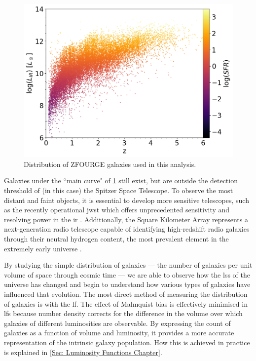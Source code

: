 \begin{figure}[h]
    \centering
    \includegraphics[width=\textwidth]{Figures/ZFOURGE Initial Distribution.png}
    \caption{Distribution of ZFOURGE galaxies used in this analysis.}
    \label{Fig: ZFOURGE Distribution}
\end{figure}

Galaxies under the ``main curve" of \cref{Fig: ZFOURGE Distribution} still exist, but are outside the detection threshold of (in this case) the Spitzer Space Telescope. To observe the most distant and faint objects, it is essential to develop more sensitive telescopes, such as the recently operational \gls{jwst} \citep{gardner_james_2006} which offers unprecedented sensitivity and resolving power in the \gls{ir} \citep{labiano_wavelength_2021}. Additionally, the Square Kilometer Array \citep{dewdney_square_2009} represents a next-generation radio telescope capable of identifying high-redshift radio galaxies through their neutral hydrogen content, the most prevalent element in the extremely early universe \citep{furlanetto_cosmology_2006}.

By studying the simple distribution of galaxies --- the number of galaxies per unit volume of space through cosmic time --- we are able to observe how the \gls{lss} of the universe has changed and begin to understand how various types of galaxies have influenced that evolution. The most direct method of measuring the distribution of galaxies is with the \gls{lf}. The effect of Malmquist bias is effectively minimised in \gls{lf}s because number density corrects for the difference in the volume over which galaxies of different luminosities are observable. By expressing the count of galaxies as a function of volume and luminosity, it provides a more accurate representation of the intrinsic galaxy population. How this is achieved in practice is explained in \cref{Sec: Luminosity Functions Chapter}.
